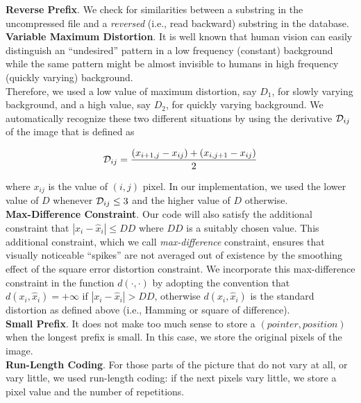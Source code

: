 \documentclass[11pt,a4paper]{article}
\newcommand{\tx}{\hat{x}}
\newcommand{\D}{{\cal D}}
\begin{document}
{\bf Reverse Prefix}. We check for similarities between a substring in the
uncompressed file and a {\it reversed} (i.e., read backward) substring in
the database.\\

{\bf Variable Maximum Distortion}.  It is well known that human vision can
easily distinguish an ``undesired'' pattern in a low frequency (constant)
background while the same pattern might be almost invisible to humans in
high frequency (quickly varying) background.\\

Therefore, we used a low value of maximum distortion, say $D_1$, for slowly
varying background, and a high value, say $D_2$, for quickly varying
background. We automatically recognize these two different situations by
using the derivative $\D_{ij}$ of the image that is defined as

$$
\D_{ij} ={(x_{i+1,j}-x_{ij})+(x_{i,j+1}-x_{ij}) \over 2}
$$

where $x_{ij}$ is the value of $(i,j)$ pixel.  In our implementation, we
used the lower value of $D$ whenever $\D_{ij}\leq 3$ and the higher value
of $D$ otherwise.\\

{\bf Max-Difference Constraint}.  Our code will also satisfy the additional
constraint that $| x_i - \tx_i | \leq DD$ where $DD$ is a suitably chosen
value. This additional constraint, which we call {\it max-difference}
constraint, ensures that visually noticeable ``spikes'' are not averaged
out of existence by the smoothing effect of the square error distortion
constraint.  We incorporate this max-difference constraint in the function
$d(\cdot , \cdot )$ by adopting the convention that $d( x_i , \tx_i ) = +
\infty$ if $| x_i - \tx_i | > DD$, otherwise $d( x_i , \tx_i )$ is the
standard distortion as defined above (i.e., Hamming or square of
difference).\\

{\bf Small Prefix}. It does not make too much sense to
store a $(pointer,position)$ when the longest prefix is small.
In this case, we store the original pixels of the image.\\

{\bf Run-Length Coding}. For those parts of the
picture that do not vary at all, or vary little,
we used run-length coding: if the next pixels vary little,
we store a pixel value and the number of repetitions.
\end{document}
